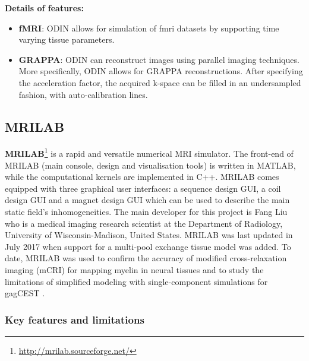 \hfill

\textbf{Details of features:}
\begin{itemize}
    
    \item \textbf{fMRI}: ODIN allows for simulation of \ac{fmri} datasets by supporting time varying tissue parameters.
    
    \item \textbf{GRAPPA}: ODIN can reconstruct images using parallel imaging techniques.
    More specifically, ODIN allows for GRAPPA reconstructions.
    After specifying the acceleration factor, the acquired k-space can be filled in an undersampled fashion, with auto-calibration lines.
    
\end{itemize}

\hfill

\subsection{MRILAB}
\textbf{MRILAB}\footnote{\url{http://mrilab.sourceforge.net/}} is a rapid and versatile numerical MRI simulator. 
The front-end of MRILAB (main console, design and visualisation tools) is written in MATLAB, while the computational kernels are implemented in C++.
MRILAB comes equipped with three graphical user interfaces: a sequence design GUI, a coil design GUI and a magnet design GUI which can be used to describe the main static field's inhomogeneities.
The main developer for this project is Fang Liu who is a medical imaging research scientist at the Department of Radiology, University of Wisconsin-Madison, United States.
MRILAB was last updated in July 2017 when support for a multi-pool exchange tissue model was added.
To date, MRILAB was used to confirm the accuracy of modified cross-relaxation imaging (mCRI) for mapping myelin in neural tissues and to study the limitations of simplified modeling with single-component simulations for gagCEST \cite{Liu2017}.

\hfill
    
\subsubsection{Key features and limitations}

